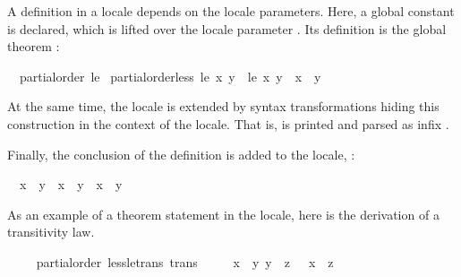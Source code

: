 \begin{isabellebody}
\begin{isamarkuptext}
A definition in a locale depends on the locale parameters.
  Here, a global constant  is declared, which is lifted over the
  locale parameter .  Its definition is the global theorem
  :
  \begin{isabelle}%
\ \ partial{\isacharunderscore}order\ {\isacharquery}le\ {\isasymLongrightarrow}\isanewline
\isaindent{\ \ }partial{\isacharunderscore}order{\isachardot}less\ {\isacharquery}le\ {\isacharquery}x\ {\isacharquery}y\ {\isacharequal}\ {\isacharparenleft}{\isacharquery}le\ {\isacharquery}x\ {\isacharquery}y\ {\isasymand}\ {\isacharquery}x\ {\isasymnoteq}\ {\isacharquery}y{\isacharparenright}%
\end{isabelle}
  At the same time, the locale is extended by syntax transformations
  hiding this construction in the context of the locale.  That is,
   is printed and parsed as infix
  \isa{{\isasymsqsubset}}.%
\end{isamarkuptext}%
\isamarkuptrue%
%
\begin{isamarkuptext}%
Finally, the conclusion of the definition
  is added to the locale, :
  \begin{isabelle}%
\ \ {\isacharparenleft}{\isacharquery}x\ {\isasymsqsubset}\ {\isacharquery}y{\isacharparenright}\ {\isacharequal}\ {\isacharparenleft}{\isacharquery}x\ {\isasymsqsubseteq}\ {\isacharquery}y\ {\isasymand}\ {\isacharquery}x\ {\isasymnoteq}\ {\isacharquery}y{\isacharparenright}%
\end{isabelle}%
\end{isamarkuptext}%
\isamarkuptrue%
%
\begin{isamarkuptext}%
As an example of a theorem statement in the locale, here is the
  derivation of a transitivity law.%
\end{isamarkuptext}%
\isamarkuptrue%
\ \ \isamarkupfalse%
\ {\isacharparenleft}\ partial{\isacharunderscore}order{\isacharparenright}\ less{\isacharunderscore}le{\isacharunderscore}trans\ {\isacharbrackleft}trans{\isacharbrackright}{\isacharcolon}\isanewline
\ \ \ \ {\isachardoublequoteopen}{\isasymlbrakk}\ x\ {\isasymsqsubset}\ y{\isacharsemicolon}\ y\ {\isasymsqsubseteq}\ z\ {\isasymrbrakk}\ {\isasymLongrightarrow}\ x\ {\isasymsqsubset}\ z{\isachardoublequoteclose}\isanewline
%
\isadelimvisible
\ \ \ \ %
\endisadelimvisible
%
\isatagvisible
{}\isamarkupfalse%

\end{isabellebody}
